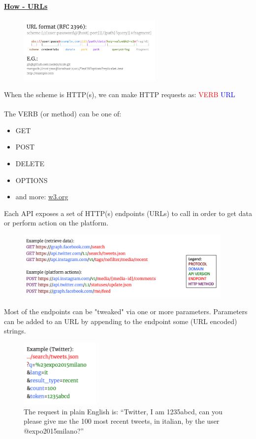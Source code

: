 \documentclass[10pt,a4paper]{article}
\newcommand{\nline}{\\~\\}
\begin{document}
 \paragraph{\uline{How - URLs}}
    \begin{figure}[ht!]
 \hfill \includegraphics[width=200pt]{images/data-acquisition-url}
 \hspace*{\fill} 
 \end{figure}
 When the scheme is HTTP(s), we can make HTTP requests as:
 \textcolor{red}{VERB} \textcolor{blue}{URL} \nline
 The VERB (or method) can be one of:
 \begin{itemize}
 	\item GET
 	\item POST
 	\item DELETE
 	\item OPTIONS
 	\item and more: \href{http://www.w3.org/Protocols/rfc2616/rfc2616-sec9.html}{w3.org}
 \end{itemize}
 Each API exposes a set of HTTP(s) endpoints (URLs) to call in order to get data or perform action on the platform.
     \begin{figure}[ht!]
 \hfill \includegraphics[width=300pt]{images/data-acquisition-endpoints}
 \hspace*{\fill} 
 \end{figure}
 \pagebreak
 Most of the endpoints can be "tweaked" via one or more parameters. Parameters can be added to an URL by appending to the endpoint some (URL encoded) strings.
 \begin{figure}[ht!]
 \hfill \includegraphics[width=110pt]{images/data-acquisition-parameters}
 \hspace*{\fill}
 \caption{The request in plain English is: “Twitter, I am 1235abcd, can you please give me the 100 most recent tweets, in italian, by the user @expo2015milano?”} 
 \end{figure}
\end{document}
